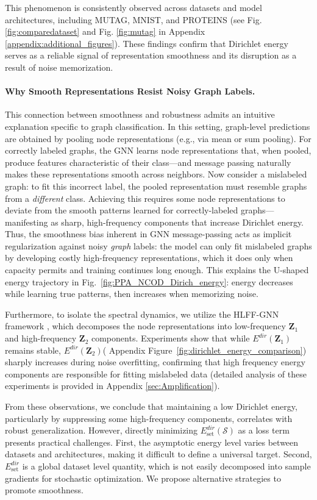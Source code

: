 This phenomenon is consistently observed across datasets and model architectures, including MUTAG, MNIST, and PROTEINS (see 
Fig. \ref{fig:comparedataset} and Fig. \ref{fig:mutag} in Appendix \ref{appendix:additional_figures}). These findings confirm that Dirichlet energy serves as a reliable signal of representation smoothness and its disruption as a result of noise memorization.
\paragraph{Why Smooth Representations Resist Noisy Graph Labels.}
This connection between smoothness and robustness admits an intuitive explanation specific to graph classification. 
In this setting, graph-level predictions are obtained by pooling node representations (e.g., via mean or sum pooling). 
For correctly labeled graphs, the GNN learns node representations that, when pooled, produce features characteristic of their class—and message passing naturally makes these representations smooth across neighbors.
%
Now consider a mislabeled graph: to fit this incorrect label, the pooled representation must resemble graphs from a \emph{different} class. 
Achieving this requires some node representations to deviate from the smooth patterns learned for correctly-labeled graphs—manifesting as sharp, high-frequency components that increase Dirichlet energy.
%
Thus, the smoothness bias inherent in GNN message-passing acts as implicit regularization against noisy \emph{graph} labels: the model can only fit mislabeled graphs by developing costly high-frequency representations, which it does only when capacity permits and training continues long enough.
This explains the U-shaped energy trajectory in Fig.~\ref{fig:PPA_NCOD_Dirich_energy}: energy decreases while learning true patterns, then increases when memorizing noise.

Furthermore, to isolate the spectral dynamics, we utilize the HLFF-GNN framework \cite{hlffgnn}, which decomposes the node representations into low-frequency \( \mathbf{Z}_1 \) and high-frequency \( \mathbf{Z}_2 \) components. Experiments show that while \( E^{dir}(\mathbf{Z}_1) \) remains stable, \( E^{dir}(\mathbf{Z}_2) \)( Appendix Figure~\ref{fig:dirichlet_energy_comparison}) sharply increases during noise overfitting, confirming that high frequency energy components are responsible for fitting mislabeled data (detailed analysis of these experiments is provided in Appendix \ref{sec:Amplification}).

From these observations, we conclude that maintaining a low Dirichlet energy, particularly by suppressing some high-frequency components, correlates with robust generalization. However, directly minimizing \( E^{dir}_{\text{set}}(\mathcal{S}) \) as a loss term presents practical challenges. First, the asymptotic energy level varies between datasets and architectures, making it difficult to define a universal target. Second, \( E^{dir}_{\text{set}} \) is a global dataset level quantity, which is not easily decomposed into sample gradients for stochastic optimization. We propose alternative strategies to promote smoothness.



